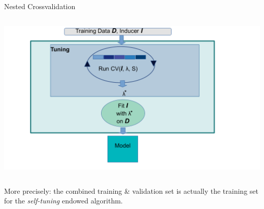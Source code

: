 \begin{frame}{Nested Crossvalidation}
\begin{columns}[c, onlytextwidth]
\hspace*{-0.7cm}
\begin{center}
\includegraphics[width=1.2\textwidth]{images/autotune_in_model_fit.pdf}
\end{center}
\end{columns}

\framebreak

More precisely: the combined training \& validation set is actually the training set for the \textit{self-tuning} endowed algorithm.


\end{frame}
